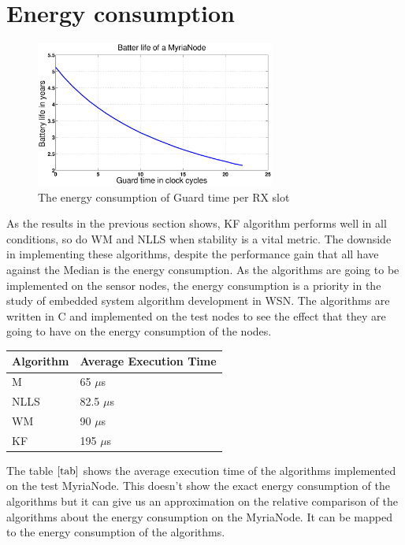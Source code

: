 \documentclass[a4paper,10pt]{report}
\begin{document}
\section{\textbf{Energy consumption}}
\begin{figure}
\centering
\includegraphics[width=0.7\textwidth]{guardsave}
\caption{The energy consumption of Guard time per RX slot}
\label{guardsave}
\end{figure}
As the results in the previous section shows, KF algorithm performs well in all conditions, so do WM and NLLS when stability is a vital metric. The downside in implementing these algorithms, despite the performance gain that all have against the Median is the energy consumption. As the algorithms are going to be implemented on the sensor nodes, the energy consumption is a priority in the study of embedded system algorithm development in WSN. The algorithms are written in C and implemented on the test nodes to see the effect that they are going to have on the energy consumption of the nodes.
\begin{center}
    \begin{tabular}{ |p{2cm} | p{4.75cm} |}
    \hline
    Algorithm & Average Execution Time \\ \hline
    M &  65 $\mu$s \\ \hline
    NLLS & 82.5 $\mu$s \\ \hline
    WM &   90 $\mu$s \\ \hline
    KF &  195 $\mu$s  \\ \hline
    \end{tabular}
\label{tab}
\end{center}
The table $\ref{tab}$ shows the average execution time of the algorithms implemented on the test MyriaNode. This doesn't show the
exact energy consumption of the algorithms but it can give us an approximation on the relative comparison of the algorithms about the energy consumption on the MyriaNode. It can be mapped to the energy consumption of the algorithms.
\end{document}
